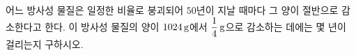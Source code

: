 어느 방사성 물질은 일정한 비율로 붕괴되어 $50$년이 지날 때마다 그 양이 절반으로 감소한다고 한다. 이 방사성 물질의 양이 $1024\mkern3mu \mathrm{g}$에서 $\dfrac{1}{4}\mkern3mu \mathrm{g}$으로 감소하는 데에는 몇 년이 걸리는지 구하시오.
